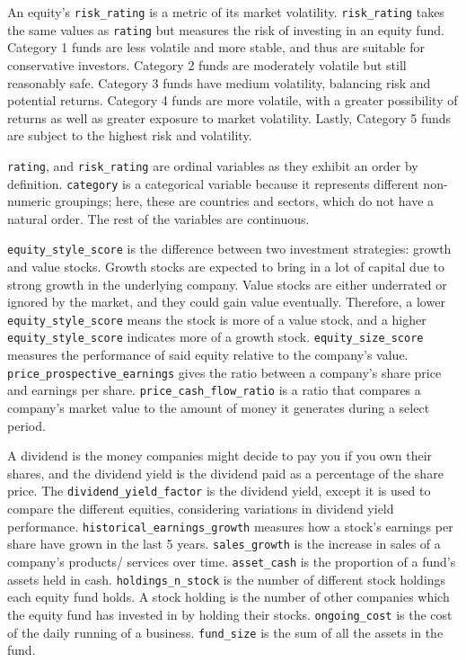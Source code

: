 \documentclass[11pt]{report} %
\begin{document}
An equity's \texttt{risk\_rating} is a metric of its market volatility.\cite{stockopedia2024} \texttt{risk\_rating} takes the same values as \texttt{rating} but measures the risk of investing in an equity fund. Category 1 funds are less volatile and more stable, and thus are suitable for conservative investors. Category 2 funds are moderately volatile but still reasonably safe. Category 3 funds have medium volatility, balancing risk and potential returns. Category 4 funds are more volatile, with a greater possibility of returns as well as greater exposure to market volatility. Lastly, Category 5 funds are subject to the highest risk and volatility.

\texttt{rating}, and \texttt{risk\_rating} are ordinal variables as they exhibit an order by definition. \texttt{category} is a categorical variable because it represents different non-numeric groupings; here, these are countries and sectors, which do not have a natural order.\cite{james2021islr} The rest of the variables are continuous.

\texttt{equity\_style\_score} is the difference between two investment strategies: growth and value stocks.\cite{amg2023} Growth stocks are expected to bring in a lot of capital due to strong growth in the underlying company.\cite{hayes2023} Value stocks are either underrated or ignored by the market, and they could gain value eventually.\cite{hayes2023} Therefore, a lower \texttt{equity\_style\_score} means the stock is more of a value stock, and a higher \texttt{equity\_style\_score} indicates more of a growth stock.
\texttt{equity\_size\_score} measures the performance of said equity relative to the company's value.\cite{adatiya2022} \texttt{price\_prospective\_earnings} gives the ratio between a company's share price and earnings per share. \texttt{price\_cash\_flow\_ratio} is a ratio that compares a company's market value to the amount of money it generates during a select period.\cite{adatiya2022}

A dividend is the money companies might decide to pay you if you own their shares, and the dividend yield is the dividend paid as a percentage of the share price. The \texttt{dividend\_yield\_factor}	is the dividend yield, except it is used to compare the different equities, considering variations in dividend yield performance. \texttt{historical\_earnings\_growth} measures how a stock's earnings per share have grown in the last 5 years. \texttt{sales\_growth} is the increase in sales of a company's products/ services over time. \texttt{asset\_cash} is the proportion of a fund's assets held in cash. \texttt{holdings\_n\_stock}	is the number of different stock holdings each equity fund holds. A stock holding is the number of other companies which the equity fund has invested in by holding their stocks. \texttt{ongoing\_cost} is the cost of the daily running of a business.\cite{murphy2024_operating_costs}	\texttt{fund\_size} is the sum of all the assets in the fund.
\vspace{-0.2cm}
\end{document}
